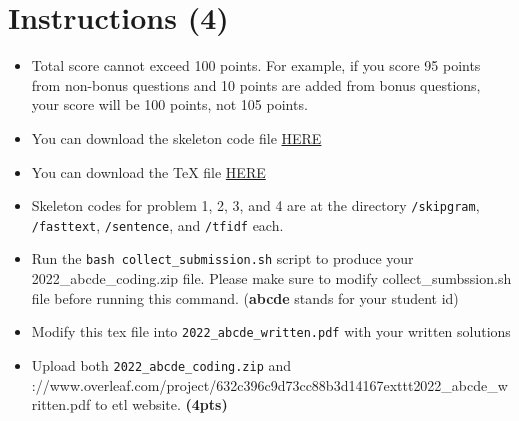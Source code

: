 \documentclass{assignment format}
\begin{document}
\begin{center}

\end{center}
\def\showanswers{1}

\section{Instructions (4)}
\begin{itemize}
\item Total score cannot exceed 100 points. For example, if you score 95 points from non-bonus questions and 10 points are added from bonus questions, your score will be 100 points, not 105 points.
\item You can download the skeleton code file \href{https://raw.githubusercontent.com/yc-song/gsds-nlp-assignment-1/main/a1.zip}{HERE} 
\item You can download the TeX file \href{https://raw.githubusercontent.com/yc-song/gsds-nlp-assignment-1/main/a1(tex).zip}{HERE} 
\item Skeleton codes for problem 1, 2, 3, and 4 are at the directory \texttt{/skipgram}, \texttt{/fasttext}, \texttt{/sentence}, and \texttt{/tfidf} each. 
\item Run the \texttt{bash collect\_submission.sh} script to produce your 2022\_abcde\_coding.zip file. Please make sure to modify collect\_sumbssion.sh file before running this command. (\textbf{abcde} stands for your student id)
\item Modify this tex file into \texttt{2022\_abcde\_written.pdf} with your written solutions
\item Upload both \texttt{2022\_abcde\_coding.zip} and \thttps://www.overleaf.com/project/632c396c9d73cc88b3d14167exttt{2022\_abcde\_written.pdf} to etl website. \textbf{(4pts)}
\end{itemize}

\end{document}
